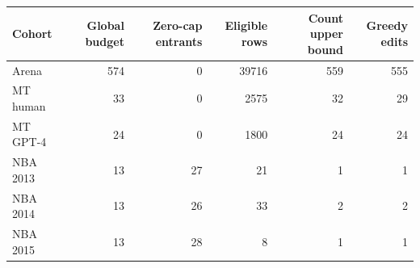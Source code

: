 \begin{tabular}{lrrrrr}
\toprule
Cohort & Global budget & Zero-cap entrants & Eligible rows & Count upper bound & Greedy edits \\
\midrule
Arena & 574 & 0 & 39716 & 559 & 555 \\
MT human & 33 & 0 & 2575 & 32 & 29 \\
MT GPT-4 & 24 & 0 & 1800 & 24 & 24 \\
NBA 2013 & 13 & 27 & 21 & 1 & 1 \\
NBA 2014 & 13 & 26 & 33 & 2 & 2 \\
NBA 2015 & 13 & 28 & 8 & 1 & 1 \\
\bottomrule
\end{tabular}
